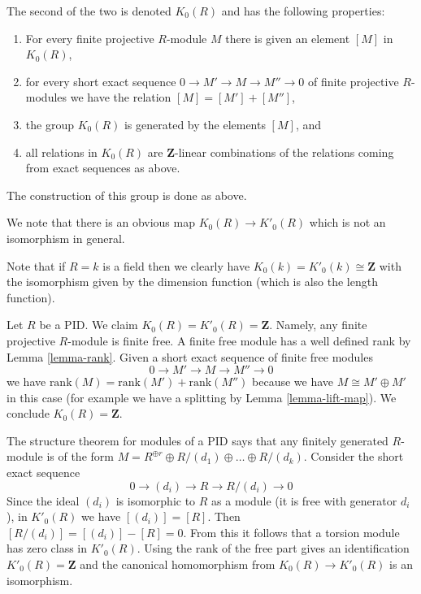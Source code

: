 \noindent
The second of the two is denoted $K_0(R)$ and has the following
properties:
\begin{enumerate}
\item For every finite projective $R$-module $M$ there
is given an element $[M]$ in $K_0(R)$,
\item for every short exact sequence $0 \to M' \to M \to M'' \to 0$
of finite projective $R$-modules we have the relation $[M] = [M'] + [M'']$,
\item the group $K_0(R)$ is generated by the elements $[M]$, and
\item all relations in $K_0(R)$ are $\mathbf{Z}$-linear combinations
of the relations coming from exact sequences as above.
\end{enumerate}
The construction of this group is done as above.

\medskip\noindent
We note that there is an obvious map $K_0(R) \to K'_0(R)$
which is not an isomorphism in general.

\begin{example}
\label{example-K0-field}
Note that if $R = k$ is a field then we clearly have
$K_0(k) = K'_0(k) \cong \mathbf{Z}$ with the isomorphism
given by the dimension function (which is also the length function).
\end{example}

\begin{example}
\label{example-K0-PID}
Let $R$ be a PID. We claim $K_0(R) = K'_0(R) = \mathbf{Z}$.
Namely, any finite projective $R$-module is finite free.
A finite free module has a well defined rank by Lemma \ref{lemma-rank}.
Given a short exact sequence of finite free modules
$$
0 \to M' \to M \to M'' \to 0
$$
we have $\text{rank}(M) = \text{rank}(M') + \text{rank}(M'')$
because we have $M \cong M' \oplus M'$ in this case (for example
we have a splitting by Lemma \ref{lemma-lift-map}).
We conclude $K_0(R) = \mathbf{Z}$.

\medskip\noindent
The structure theorem for modules of a PID says that
any finitely generated $R$-module is of the form
$M = R^{\oplus r} \oplus R/(d_1) \oplus \ldots \oplus R/(d_k)$.
Consider the short exact sequence
$$
0 \to (d_i) \to R \to R/(d_i) \to 0
$$
Since the ideal $(d_i)$ is isomorphic to $R$ as a module
(it is free with generator $d_i$), in $K'_0(R)$ we have
$[(d_i)] = [R]$.  Then $[R/(d_i)] = [(d_i)]-[R] = 0$.  From this it
follows that a torsion module has zero class in $K'_0(R)$.
Using the rank of the free part gives an identification $K'_0(R) = \mathbf{Z}$
and the canonical homomorphism from $K_0(R) \to K'_0(R)$ is an isomorphism.
\end{example}

